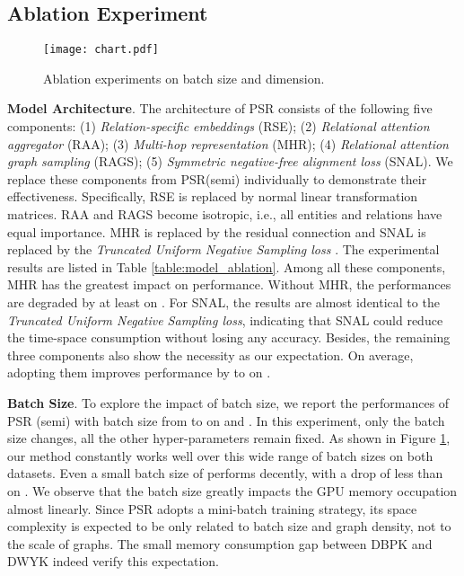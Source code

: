 \documentclass[sigconf]{acmart}
\begin{document}
\subsection{Ablation Experiment}


\begin{figure}
  \centering
  \texttt{[image: chart.pdf]}
  \caption{Ablation experiments on batch size and dimension.}\label{fig:chart}
\end{figure}

\noindent
\textbf{Model Architecture}.
The architecture of PSR consists of the following five components:
(1) \emph{Relation-specific embeddings} (RSE);
(2) \emph{Relational attention aggregator} (RAA);
(3) \emph{Multi-hop representation} (MHR);
(4) \emph{Relational attention graph sampling} (RAGS);
(5) \emph{Symmetric negative-free alignment loss} (SNAL).
We replace these components from PSR(semi) individually to demonstrate their effectiveness.
Specifically, RSE is replaced by normal linear transformation matrices.
RAA and RAGS become isotropic, i.e., all entities and relations have equal importance.
MHR is replaced by the residual connection \cite{DBLP:conf/cvpr/HeZRS16} and SNAL is replaced by the \emph{Truncated Uniform Negative Sampling loss} \cite{DBLP:conf/ijcai/SunHZQ18}.
The experimental results are listed in Table \ref{table:model_ablation}.
Among all these components, MHR has the greatest impact on performance.
Without MHR, the performances are degraded by at least  on .
For SNAL, the results are almost identical to the \emph{Truncated Uniform Negative Sampling loss}, indicating that SNAL could reduce the time-space consumption without losing any accuracy.
Besides, the remaining three components also show the necessity as our expectation.
On average, adopting them improves performance by  to  on .
\clearpage

\noindent
\textbf{Batch Size}.
To explore the impact of batch size, we report the performances of PSR (semi) with batch size from  to  on  and .
In this experiment, only the batch size changes, all the other hyper-parameters remain fixed.
As shown in Figure \ref{fig:chart}, our method constantly works well over this wide range of batch sizes on both datasets.
Even a small batch size of  performs decently, with a drop of less than  on .
We observe that the batch size greatly impacts the GPU memory occupation almost linearly.
Since PSR adopts a mini-batch training strategy, its space complexity is expected to be only related to batch size and graph density, not to the scale of graphs. 
The small memory consumption gap between DBPK and DWYK indeed verify this expectation. 
\end{document}
